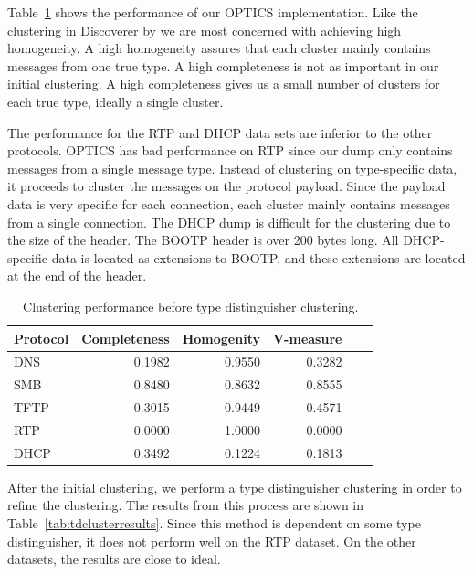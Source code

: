 \documentclass[a4paper]{report}
\begin{document}
Table~\ref{tab:initclusterresults} shows the performance of our OPTICS
implementation. Like the clustering in Discoverer by \citeauthor{cui07} we
are most concerned with achieving high homogeneity. A high homogeneity assures
that each cluster mainly contains messages from one true type. A high
completeness is not as important in our initial clustering. A high completeness
gives us a small number of clusters for each true type, ideally a single
cluster.

The performance for the RTP and DHCP data sets are inferior to the other
protocols. OPTICS has bad performance on RTP since our dump only contains messages
from a single message type. Instead of clustering on type-specific data, it
proceeds to cluster the messages on the protocol payload. Since the payload
data is very specific for each connection, each cluster mainly contains
messages from a single connection. The DHCP dump is difficult for the
clustering due to the size of the header. The BOOTP header is over 200 bytes
long. All DHCP-specific data is located as extensions to BOOTP, and these
extensions are located at the end of the header.

\begin{table}[h]
    \centering
    \captionsetup{width=0.8\textwidth}
    \caption{Clustering performance before type distinguisher clustering.}
    \begin{tabular}{| l | r | r | r | r | r |}
        \hline
        \textbf{Protocol}&\textbf{Completeness}&\textbf{Homogenity}&\textbf{V-measure} \\ \hline
        DNS & 0.1982 & 0.9550 & 0.3282 \\ \hline
        SMB & 0.8480 & 0.8632 & 0.8555 \\ \hline
        TFTP & 0.3015 & 0.9449 & 0.4571 \\ \hline
        RTP & 0.0000 & 1.0000 & 0.0000 \\ \hline
        DHCP & 0.3492 & 0.1224 & 0.1813 \\ \hline
    \end{tabular}
    \label{tab:initclusterresults}
\end{table}

After the initial clustering, we perform a type distinguisher clustering in order
to refine the clustering. The results from this process are shown in
Table~\ref{tab:tdclusterresults}. Since this method is dependent on some
type distinguisher, it does not perform well on the RTP dataset. On the
other datasets, the results are close to ideal.
\end{document}
